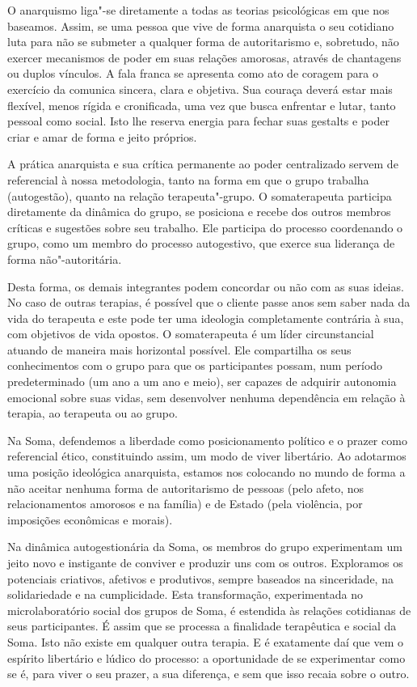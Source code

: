 O anarquismo liga"-se diretamente a todas as teorias psicológicas em que
nos baseamos. Assim, se uma pessoa que vive de forma anarquista o seu
cotidiano luta para não se submeter a qualquer forma de autoritarismo e,
sobretudo, não exercer mecanismos de poder em suas relações amorosas,
através de chantagens ou duplos vínculos. A fala franca se apresenta
como ato de coragem para o exercício da comunica sincera, clara e
objetiva. Sua couraça deverá estar mais flexível, menos rígida e
cronificada, uma vez que busca enfrentar e lutar, tanto pessoal como
social. Isto lhe reserva energia para fechar suas gestalts e poder criar
e amar de forma e jeito próprios.

A prática anarquista e sua crítica permanente ao poder centralizado
servem de referencial à nossa metodologia, tanto na forma em que o grupo
trabalha (autogestão), quanto na relação terapeuta"-grupo. O
somaterapeuta participa diretamente da dinâmica do grupo, se posiciona e
recebe dos outros membros críticas e sugestões sobre seu trabalho. Ele
participa do processo coordenando o grupo, como um membro do processo
autogestivo, que exerce sua liderança de forma não"-autoritária.

Desta forma, os demais integrantes podem concordar ou não com as suas
ideias. No caso de outras terapias, é possível que o cliente passe anos
sem saber nada da vida do terapeuta e este pode ter uma ideologia
completamente contrária à sua, com objetivos de vida opostos. O
somaterapeuta é um líder circunstancial atuando de maneira mais
horizontal possível. Ele compartilha os seus conhecimentos com o grupo
para que os participantes possam, num período predeterminado (um ano a
um ano e meio), ser capazes de adquirir autonomia emocional sobre suas
vidas, sem desenvolver nenhuma dependência em relação à terapia, ao
terapeuta ou ao grupo.

Na Soma, defendemos a liberdade como posicionamento político e o prazer
como referencial ético, constituindo assim, um modo de viver libertário.
Ao adotarmos uma posição ideológica anarquista, estamos nos colocando no
mundo de forma a não aceitar nenhuma forma de autoritarismo de pessoas
(pelo afeto, nos relacionamentos amorosos e na família) e de Estado
(pela violência, por imposições econômicas e morais).

Na dinâmica autogestionária da Soma, os membros do grupo experimentam um
jeito novo e instigante de conviver e produzir uns com os outros.
Exploramos os potenciais criativos, afetivos e produtivos, sempre
baseados na sinceridade, na solidariedade e na cumplicidade. Esta
transformação, experimentada no microlaboratório social dos grupos de
Soma, é estendida às relações cotidianas de seus participantes. É assim
que se processa a finalidade terapêutica e social da Soma. Isto não
existe em qualquer outra terapia. E é exatamente daí que vem o espírito
libertário e lúdico do processo: a oportunidade de se experimentar como
se é, para viver o seu prazer, a sua diferença, e sem que isso recaia
sobre o outro.


